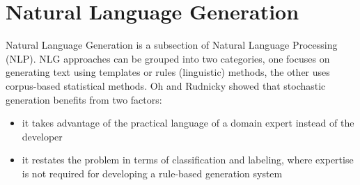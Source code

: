 \chapter{Natural Language Generation}\label{nlg}
Natural Language Generation is a subsection of Natural Language Processing (NLP). 
NLG approaches can be grouped into two categories, one focuses on generating text using templates or rules (linguistic) methods, the other uses corpus-based statistical methods. Oh and Rudnicky showed that stochastic generation benefits from two factors: 
\begin{itemize}
	\item it takes advantage of the practical language of a domain expert instead of the developer
	\item it restates the problem in terms of classification and labeling, where expertise is not required for developing a rule-based generation system
\end{itemize}
\cite{stochastic_language_generation_ds}